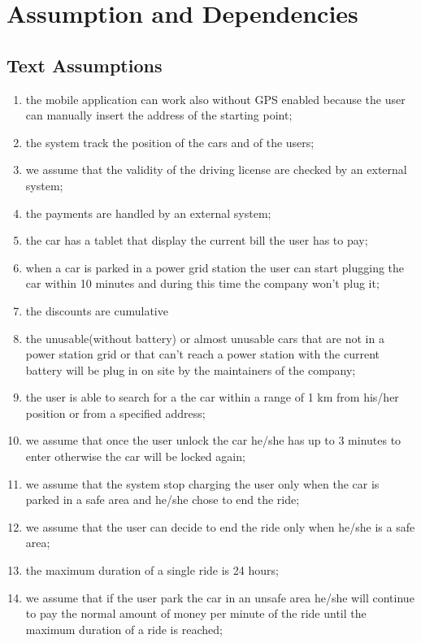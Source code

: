 \section{Assumption and Dependencies}

\subsection{Text Assumptions}
\begin{enumerate}
	\item the mobile application can work also without GPS enabled because the user can manually insert the address of the starting point;
	\item the system track the position of the cars and of the users;
	\item we assume that the validity of the driving license are checked by an external system;
	\item the payments are handled by an external system;
	\item the car has a tablet that display the current bill the user has to pay;
	\item when a car is parked in a power grid station the user can start plugging the car within 10 minutes and during this time the company won't plug it;
	\item the discounts are cumulative
	\item the unusable(without battery) or almost unusable cars that are not in a power station grid or that can't reach a power station with the current battery will be plug in on site by the maintainers of the company;
	\item the user is able to search for a the car within a range of 1 km from his/her position or from a specified address;
	\item we assume that once the user unlock the car he/she has up to 3 minutes to enter otherwise the car will be locked again;
	\item we assume that the system stop charging the user only when the car is parked in a safe area and he/she chose to end the ride;
	\item we assume that the user can decide to end the ride only when he/she is a safe area;
	\item the maximum duration of a single ride is 24 hours;
	\item we assume that if the user park the car in an unsafe area he/she will continue to pay the normal amount of money per minute of the ride until the maximum duration of a ride is reached;

\end{enumerate}
